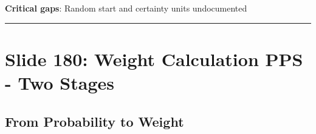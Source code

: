 \documentclass[
]{article}
\begin{document}
\textbf{Critical gaps}: Random start and certainty units undocumented

\begin{center}\rule{0.5\linewidth}{0.5pt}\end{center}

\section{Slide 180: Weight Calculation PPS - Two
Stages}\label{slide-180-weight-calculation-pps---two-stages}

\subsection{From Probability to
Weight}\label{from-probability-to-weight}
\end{document}
